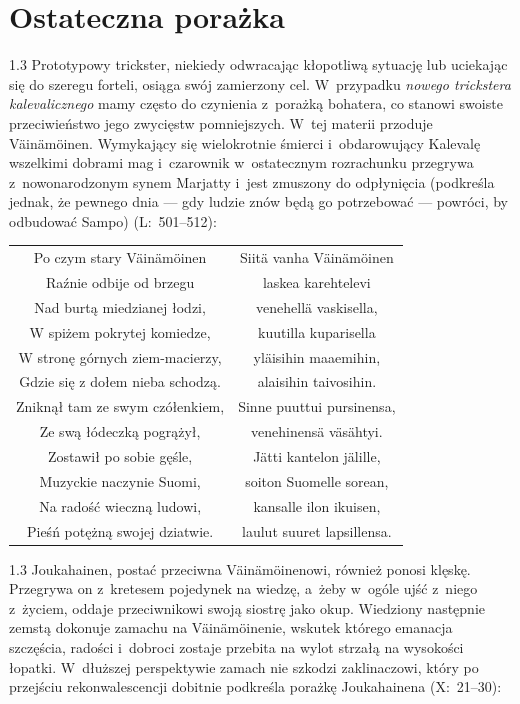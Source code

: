 \documentclass[11pt,a4paper,twoside]{report}
\begin{document}
\section{Ostateczna porażka}
\begin{spacing}{1.3}
Prototypowy trickster, niekiedy odwracając kłopotliwą sytuację lub uciekając się do szeregu forteli, osiąga swój zamierzony cel. W~przypadku \emph{nowego trickstera kalevalicznego} mamy często do czynienia z~porażką bohatera, co stanowi swoiste przeciwieństwo jego zwycięstw pomniejszych. W~tej materii przoduje Väinämöinen. Wymykający się wielokrotnie śmierci i~obdarowujący Kalevalę wszelkimi dobrami mag i~czarownik w~ostatecznym rozrachunku przegrywa z~nowonarodzonym synem Marjatty i~jest zmuszony do odpłynięcia (podkreśla jednak, że pewnego dnia --- gdy ludzie znów będą go potrzebować --- powróci, by odbudować Sampo) (L:~501--512):
\end{spacing}
{\centering
\small
\begin{longtable}{c c}
Po czym stary Väinämöinen & Siitä vanha Väinämöinen\\
Raźnie odbije od brzegu & laskea karehtelevi\\
Nad burtą miedzianej łodzi, & venehellä vaskisella,\\
W spiżem pokrytej komiedze, & kuutilla kuparisella\\
W stronę górnych ziem-macierzy, & yläisihin maaemihin,\\
Gdzie się z dołem nieba schodzą. & alaisihin taivosihin.\\
Zniknął tam ze swym czółenkiem, & Sinne puuttui pursinensa,\\
Ze swą łódeczką pogrążył, & venehinensä väsähtyi.\\
Zostawił po sobie gęśle, & Jätti kantelon jälille,\\
Muzyckie naczynie Suomi, & soiton Suomelle sorean,\\
Na radość wieczną ludowi, & kansalle ilon ikuisen,\\
Pieśń potężną swojej dziatwie. & laulut suuret lapsillensa.\\
\end{longtable}
}
\begin{spacing}{1.3}
Joukahainen, postać przeciwna Väinämöinenowi, również ponosi klęskę. Przegrywa on z~kretesem pojedynek na wiedzę, a~żeby w~ogóle ujść z~niego z~życiem, oddaje przeciwnikowi swoją siostrę jako okup. Wiedziony następnie zemstą dokonuje zamachu na Väinämöinenie, wskutek którego emanacja szczęścia, radości i~dobroci zostaje przebita na wylot strzałą na wysokości łopatki. W~dłuższej perspektywie zamach nie szkodzi zaklinaczowi, który po przejściu rekonwalescencji dobitnie podkreśla porażkę Joukahainena (X:~21--30):
\end{spacing}
\end{document}
